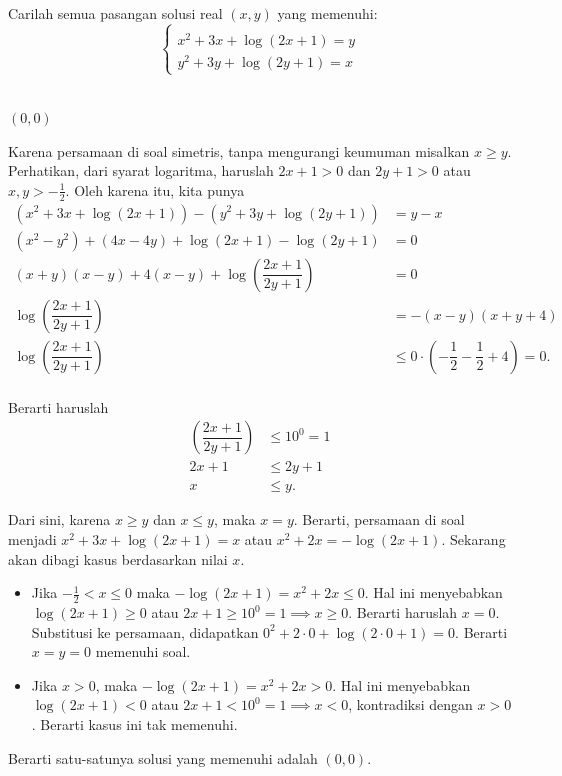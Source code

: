 \documentclass[12pt]{scrartcl}
\begin{document}
	\begin{soalbaru}
		Carilah semua pasangan solusi real $(x,y)$ yang memenuhi:\\[-10pt] 
				 		$$\begin{cases}\\[-30pt]
				 		x^2+3x+\log(2x+1)=y \\[-5pt]
				 		y^2+3y+\log(2y+1)=x
				 		\end{cases}$$\\[-10pt]
	
		\begin{jawaban}
		$(0,0)$
		\end{jawaban}
		\begin{solusi}
		Karena persamaan di soal simetris, tanpa mengurangi keumuman misalkan $x \ge y$.
		Perhatikan, dari syarat logaritma, haruslah $2x+1>0 $ dan $2y+1>0$ atau $x,y > -\frac12$. Oleh karena itu, kita punya 	
		\begin{equation*}
		\begin{split}
		(x^2+3x+\log(2x+1))-(y^2+3y+\log(2y+1))&=y-x\\
		(x^2-y^2)+(4x-4y)+\log(2x+1)-\log(2y+1)&=0\\
		(x+y)(x-y)+4(x-y)+\log\left(\dfrac{2x+1}{2y+1}\right)&=0\\
		  \log\left(\dfrac{2x+1}{2y+1}\right) &= -(x-y)(x+y+4) \\
		  \log\left(\dfrac{2x+1}{2y+1}\right)&\le 0\cdot(-\dfrac12-\dfrac12+4) = 0.\\
		\end{split}
		\end{equation*}
		
		Berarti haruslah
		\begin{equation*}
		\begin{split}
		\left(\dfrac{2x+1}{2y+1}\right)&\le 10^0 = 1\\
		2x+1 &\le 2y+1\\
		x &\le y.
		\end{split}
		\end{equation*}
		
		Dari sini, karena $x \ge y$ dan $x \le y$, maka $x=y$. Berarti, persamaan di soal menjadi $x^2+3x+\log(2x+1)=x$ atau $x^2+2x=-\log (2x+1)$.
		Sekarang akan dibagi kasus berdasarkan nilai $x$.
		
		\begin{itemize}
		\item Jika $ -\frac12 < x \le 0$ maka $-\log(2x+1)=x^2+2x \le 0$. Hal ini menyebabkan $\log(2x+1) \ge 0$ atau $2x+1 \ge 10^0=1 \implies x \ge 0$. Berarti haruslah $x=0$. Substitusi ke persamaan, didapatkan $0^2+2\cdot 0+\log(2\cdot 0+1)=0$. Berarti $x=y=0$ memenuhi soal.
		
		\item Jika $ x > 0$, maka $-\log(2x+1)=x^2+2x > 0$. Hal ini menyebabkan $\log(2x+1) < 0$ atau $2x+1 < 10^0=1 \implies x < 0$, kontradiksi dengan $x > 0$. Berarti kasus ini tak memenuhi.
		\end{itemize}
		Berarti satu-satunya solusi yang memenuhi adalah $(0,0)$.
		\end{solusi}
	\end{soalbaru}
	
\end{document}
